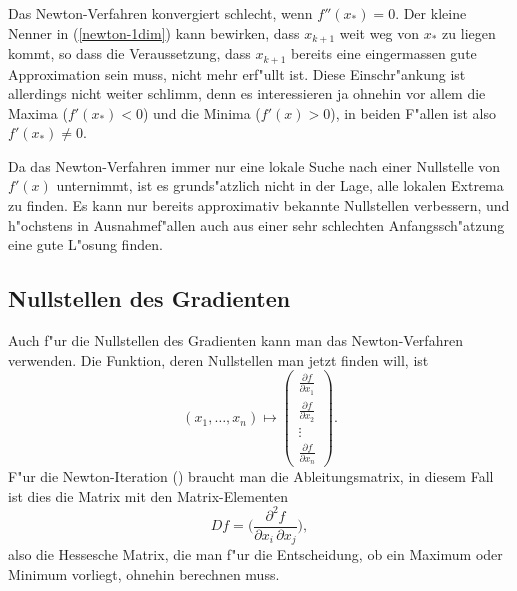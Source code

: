 Das Newton-Verfahren konvergiert schlecht, wenn $f''(x_*)=0$.
Der kleine Nenner in (\ref{newton-1dim}) kann bewirken, dass
$x_{k+1}$ weit weg von $x_*$ zu liegen kommt, so dass die
Veraussetzung, dass $x_{k+1}$ bereits eine eingermassen gute 
Approximation sein muss, nicht mehr erf"ullt ist.
Diese Einschr"ankung ist allerdings nicht weiter schlimm, denn
es interessieren ja ohnehin vor allem die Maxima ($f'(x_*)<0$)
und die Minima ($f'(x)>0$), in beiden F"allen ist also
$f'(x_*)\ne 0$.

Da das Newton-Verfahren immer nur eine lokale Suche nach einer
Nullstelle von $f'(x)$ unternimmt, ist es grunds"atzlich nicht
in der Lage, alle lokalen Extrema zu finden.
Es kann nur bereits approximativ bekannte Nullstellen verbessern,
und h"ochstens in Ausnahmef"allen auch aus einer sehr schlechten
Anfangssch"atzung eine gute L"osung finden.

\subsection{Nullstellen des Gradienten}
Auch f"ur die Nullstellen des Gradienten kann man das Newton-Verfahren
verwenden. Die Funktion, deren Nullstellen man jetzt finden will,
ist
\[
(x_1,\dots,x_n)\mapsto\begin{pmatrix}
\frac{\partial f}{\partial x_1}\\
\frac{\partial f}{\partial x_2}\\
\vdots\\
\frac{\partial f}{\partial x_n}
\end{pmatrix}.
\]
F"ur die Newton-Iteration (\label{nlp:newton-iteration-ndim}) braucht
man die Ableitungsmatrix, in diesem Fall ist dies
die Matrix mit den Matrix-Elementen
\[
Df=\biggl(
\frac{\partial^2f}{\partial x_i\,\partial x_j}
\biggr),
\]
also die Hessesche Matrix, die man f"ur die Entscheidung, ob ein
Maximum oder Minimum vorliegt, ohnehin berechnen muss.

